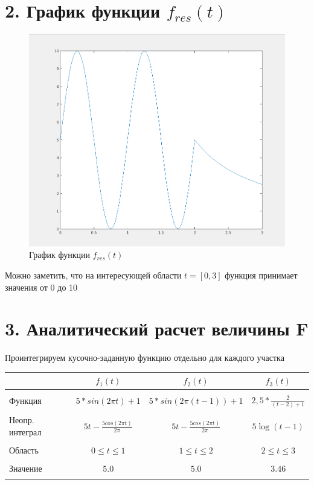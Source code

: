\documentclass[12pt]{article}
\begin{document}
 \section*{2. График функции $f_{res}(t)$}%
 \begin{figure}[!h]
	\centering
	\includegraphics[width=\linewidth]{func_graph.png}
	\caption{График функции $f_{res}(t)$}
\end{figure}
Можно заметить, что на интересующей области $t = [0,3]$ функция принимает значения от 0 до 10
 
\newpage
 \section*{3. Аналитический расчет величины F}
Проинтегрируем кусочно-заданную функцию отдельно для каждого участка
\begin{center}
	\begin{tabular}[c]{lc|c|c}
  		& $f_1(t)$ & $f_2(t)$ & $f_3(t)$ \\[2mm]\hline
  		&&&\\
		Функция & $5*sin(2 \pi t) + 1$ & $5*sin(2 \pi (t-1)) + 1$ & $2,5* \frac{2}{(t-2) + 1}$\\
		&&&\\
		Неопр. интеграл & $5t - \frac{5cos(2 \pi t)}{2 \pi}$ & $5t - \frac{5cos(2 \pi t)}{2 \pi}$ & $5\log(t-1)$\\
		&&&\\
		Область & $0 \le t \le 1$ & $1 \le t \le 2$ & $2 \le t \le 3$\\
		&&&\\
		Значение & $5.0$ & $5.0$ & $3.46$\\\\
	\end{tabular}
\end{center}
\end{document}
